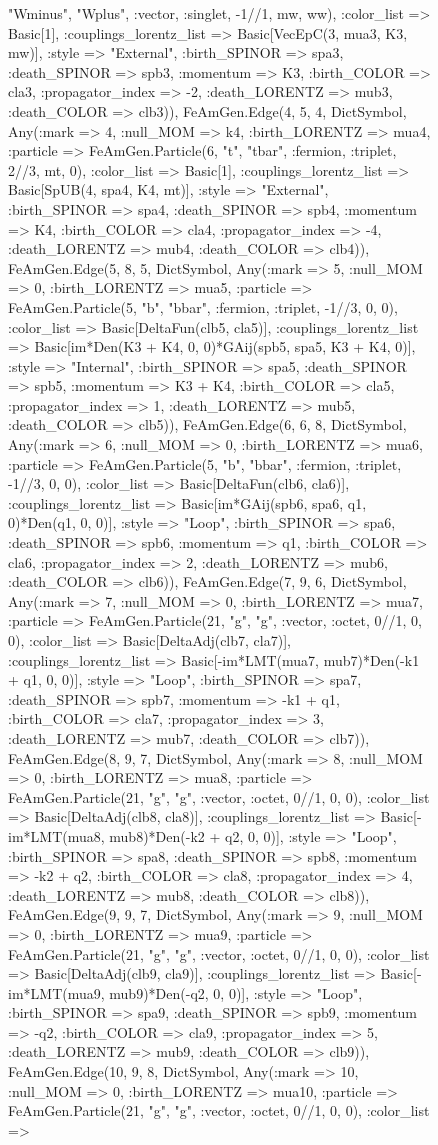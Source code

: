 \documentclass{revtex4}
\begin{document}
\begin{figure}[!htb]
\begin{center}
{"Wminus", "Wplus", :vector, :singlet, -1//1, mw, ww), :color_list => Basic[1], :couplings_lorentz_list => Basic[VecEpC(3, mua3, K3, mw)], :style => "External", :birth_SPINOR => spa3, :death_SPINOR => spb3, :momentum => K3, :birth_COLOR => cla3, :propagator_index => -2, :death_LORENTZ => mub3, :death_COLOR => clb3)), FeAmGen.Edge(4, 5, 4, Dict{Symbol, Any}(:mark => 4, :null_MOM => k4, :birth_LORENTZ => mua4, :particle => FeAmGen.Particle(6, "t", "tbar", :fermion, :triplet, 2//3, mt, 0), :color_list => Basic[1], :couplings_lorentz_list => Basic[SpUB(4, spa4, K4, mt)], :style => "External", :birth_SPINOR => spa4, :death_SPINOR => spb4, :momentum => K4, :birth_COLOR => cla4, :propagator_index => -4, :death_LORENTZ => mub4, :death_COLOR => clb4)), FeAmGen.Edge(5, 8, 5, Dict{Symbol, Any}(:mark => 5, :null_MOM => 0, :birth_LORENTZ => mua5, :particle => FeAmGen.Particle(5, "b", "bbar", :fermion, :triplet, -1//3, 0, 0), :color_list => Basic[DeltaFun(clb5, cla5)], :couplings_lorentz_list => Basic[im*Den(K3 + K4, 0, 0)*GAij(spb5, spa5, K3 + K4, 0)], :style => "Internal", :birth_SPINOR => spa5, :death_SPINOR => spb5, :momentum => K3 + K4, :birth_COLOR => cla5, :propagator_index => 1, :death_LORENTZ => mub5, :death_COLOR => clb5)), FeAmGen.Edge(6, 6, 8, Dict{Symbol, Any}(:mark => 6, :null_MOM => 0, :birth_LORENTZ => mua6, :particle => FeAmGen.Particle(5, "b", "bbar", :fermion, :triplet, -1//3, 0, 0), :color_list => Basic[DeltaFun(clb6, cla6)], :couplings_lorentz_list => Basic[im*GAij(spb6, spa6, q1, 0)*Den(q1, 0, 0)], :style => "Loop", :birth_SPINOR => spa6, :death_SPINOR => spb6, :momentum => q1, :birth_COLOR => cla6, :propagator_index => 2, :death_LORENTZ => mub6, :death_COLOR => clb6)), FeAmGen.Edge(7, 9, 6, Dict{Symbol, Any}(:mark => 7, :null_MOM => 0, :birth_LORENTZ => mua7, :particle => FeAmGen.Particle(21, "g", "g", :vector, :octet, 0//1, 0, 0), :color_list => Basic[DeltaAdj(clb7, cla7)], :couplings_lorentz_list => Basic[-im*LMT(mua7, mub7)*Den(-k1 + q1, 0, 0)], :style => "Loop", :birth_SPINOR => spa7, :death_SPINOR => spb7, :momentum => -k1 + q1, :birth_COLOR => cla7, :propagator_index => 3, :death_LORENTZ => mub7, :death_COLOR => clb7)), FeAmGen.Edge(8, 9, 7, Dict{Symbol, Any}(:mark => 8, :null_MOM => 0, :birth_LORENTZ => mua8, :particle => FeAmGen.Particle(21, "g", "g", :vector, :octet, 0//1, 0, 0), :color_list => Basic[DeltaAdj(clb8, cla8)], :couplings_lorentz_list => Basic[-im*LMT(mua8, mub8)*Den(-k2 + q2, 0, 0)], :style => "Loop", :birth_SPINOR => spa8, :death_SPINOR => spb8, :momentum => -k2 + q2, :birth_COLOR => cla8, :propagator_index => 4, :death_LORENTZ => mub8, :death_COLOR => clb8)), FeAmGen.Edge(9, 9, 7, Dict{Symbol, Any}(:mark => 9, :null_MOM => 0, :birth_LORENTZ => mua9, :particle => FeAmGen.Particle(21, "g", "g", :vector, :octet, 0//1, 0, 0), :color_list => Basic[DeltaAdj(clb9, cla9)], :couplings_lorentz_list => Basic[-im*LMT(mua9, mub9)*Den(-q2, 0, 0)], :style => "Loop", :birth_SPINOR => spa9, :death_SPINOR => spb9, :momentum => -q2, :birth_COLOR => cla9, :propagator_index => 5, :death_LORENTZ => mub9, :death_COLOR => clb9)), FeAmGen.Edge(10, 9, 8, Dict{Symbol, Any}(:mark => 10, :null_MOM => 0, :birth_LORENTZ => mua10, :particle => FeAmGen.Particle(21, "g", "g", :vector, :octet, 0//1, 0, 0), :color_list => }
\end{center}
\end{figure}
\end{document}
